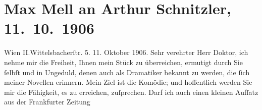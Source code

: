 

         
         \renewcommand{\erwaehntePersonen}{Personen: Josef Kainz, Max Mell, Maria Mell, Olga Schnitzler}
         \renewcommand{\erwaehnteInstitutionen}{Institutionen: Frankfurter Zeitung}
         \renewcommand{\erwaehnteOrte}{Orte: Berlin, II., Leopoldstadt, Wien, Wittelsbachstraße}
         \renewcommand{\erwaehnteWerke}{Werke: Die Komödianten, Über die Briefe Beethovens}
               \section[Max Mell an Arthur Schnitzler, 11. 10. 1906]{ Max Mell an Arthur Schnitzler, 11. 10. 1906}\nopagebreak{}\rehead{ }\begin{ledgroupsized}[t]{13cm}\normalsize\beginnumbering{} \toendnotes[C]{\smallbreak\pagebreak[2]} 
\toendnotes[C]{\smallbreak}\pstart
           \noindent{}\raggedleft{}{\pb}Wien II.Wittelsbacherſtr. 5.\pend
           \pstart
           \raggedleft{}11. Oktober 1906.\pend
           \pstart{}Sehr verehrter Herr Doktor,\pend\pstart
           ich nehme mir die Freiheit, Ihnen mein Stück zu überreichen, ermutigt durch Sie ſelbſt und in
               Ungeduld, denen auch als Dramatiker bekannt zu werden, die ſich meiner Novellen
               erinnern. Mein Ziel ist die Komödie; und hoffentlich werden Sie mir die Fähigkeit, es
               zu erreichen, zuſprechen.\pend
           \pstart
           Darf ich auch einen kleinen Aufſatz aus der Frankfurter Zeitung

\end{ledgroupsized}
